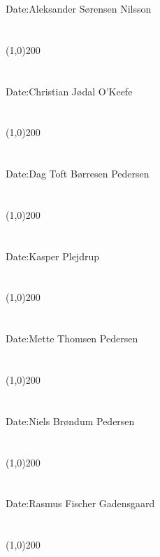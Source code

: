 Date:\indent\indent Aleksander Sørensen Nilsson\\\\\\
\indent\line(1,0){200}\\\\\\
\indent Date:\indent\indent Christian Jødal O'Keefe\\\\\\
\indent\line(1,0){200}\\\\\\
\indent Date:\indent\indent Dag Toft Børresen Pedersen\\\\\\
\indent\line(1,0){200}\\\\\\
\indent Date:\indent\indent  Kasper Plejdrup\\\\\\
\indent\line(1,0){200}\\\\\\
\indent Date:\indent\indent  Mette Thomsen Pedersen\\\\\\
\indent\line(1,0){200}\\\\\\
\indent Date:\indent\indent  Niels Brøndum Pedersen\\\\\\
\indent\line(1,0){200}\\\\\\
\indent Date:\indent\indent  Rasmus Fischer Gadensgaard\\\\\\
\indent\line(1,0){200}\\\\\\
